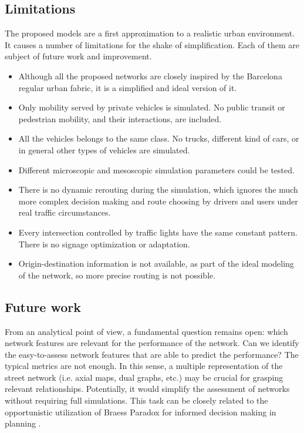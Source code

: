 \documentclass[11pt]{article}
\begin{document}


\subsection{Limitations}
The proposed models are a first approximation to a realistic urban environment. It causes a number of limitations for the shake of simplification. Each of them are subject of future work and improvement.

\begin{itemize}
\setlength\itemsep{0.05em}
    \item Although all the proposed networks are closely inspired by the Barcelona regular urban fabric, it is a simplified and ideal version of it.
    \item Only mobility served by private vehicles is simulated. No public transit or pedestrian mobility, and their interactions, are included.
    \item All the vehicles belongs to the same class. No trucks, different kind of cars, or in general other types of vehicles are simulated.
    \item Different microscopic and mesoscopic simulation parameters could be tested.
    \item There is no dynamic rerouting during the simulation, which ignores the much more complex decision making and route choosing by drivers and users under real traffic circumstances.
    \item Every intersection controlled by traffic lights have the same constant pattern. There is no signage optimization or adaptation.
    \item Origin-destination information is not available, as part of the ideal modeling of the network, so more precise routing is not possible.
\end{itemize}

\subsection{Future work}

From an analytical point of view, a fundamental question remains open: which network features are relevant for the performance of the network. Can we identify the easy-to-assess network features that are able to predict the performance? The typical metrics are not enough. In this sense, a multiple representation of the street network (i.e. axial maps, dual graphs, etc.) may be crucial for grasping relevant relationships. Potentially, it would simplify the assessment of networks without requiring full simulations. This task can be closely related to the opportunistic utilization of Braess Paradox for informed decision making in planning \citep{Bagloee2019}.
\end{document}
